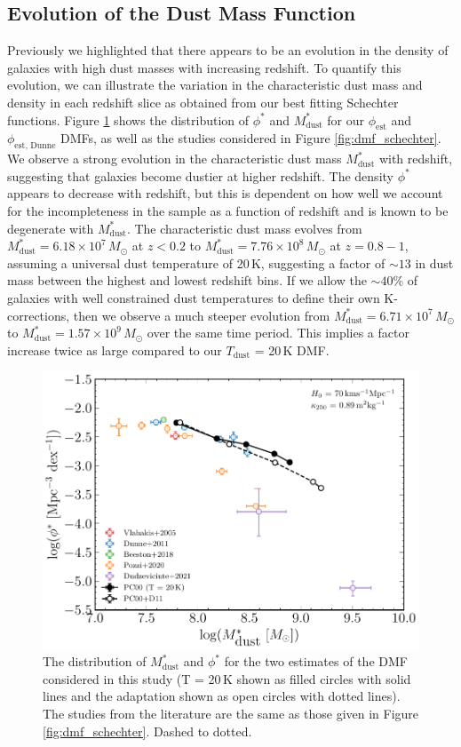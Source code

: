 \subsection{Evolution of the Dust Mass Function}

Previously we highlighted that there appears to be an evolution in the density of galaxies with high dust masses with increasing redshift. To quantify this evolution, we can illustrate the variation in the characteristic dust mass and density in each redshift slice as obtained from our best fitting Schechter functions. Figure \ref{fig:dmf_schechter_parameters} shows the distribution of $\phi^*$ and $M_{\textrm{dust}}^*$ for our $\phi_{\textrm{est}}$ and $\phi_{\textrm{est, Dunne}}$ DMFs, as well as the studies considered in Figure \ref{fig:dmf_schechter}. We observe a strong evolution in the characteristic dust mass $M_{\textrm{dust}}^*$ with redshift, suggesting that galaxies become dustier at higher redshift. The density $\phi^*$ appears to decrease with redshift, but this is dependent on how well we account for the incompleteness in the sample as a function of redshift and is known to be degenerate with $M_{\textrm{dust}}^*$. The characteristic dust mass evolves from $M_{\textrm{dust}}^* = 6.18\times10^7\,M_{\odot}$ at $z < 0.2$ to $M_{\textrm{dust}}^* = 7.76\times10^8\,M_{\odot}$ at $z = 0.8 - 1$, assuming a universal dust temperature of 20\,K, suggesting a factor of $\sim 13$ in dust mass between the highest and lowest redshift bins. If we allow the $\sim 40\%$ of galaxies with well constrained dust temperatures to define their own K-corrections, then we observe a much steeper evolution from $M_{\textrm{dust}}^* = 6.71\times10^7\,M_{\odot}$ to $M_{\textrm{dust}}^* = 1.57\times10^9\,M_{\odot}$ over the same time period. This implies a factor increase twice as large compared to our $T_{\textrm{dust}}$ = 20\,K DMF.

\begin{figure}
	\centering
	\includegraphics[width=0.75\columnwidth]{Figures/dmf_schechter_parameters.pdf}
	\caption[Distribution of $M_{\textrm{dust}}^*$ and $\phi^*$ from best fitting Schechter functions]{The distribution of $M_{\textrm{dust}}^*$ and $\phi^*$ for the two estimates of the DMF considered in this study (T = 20\,K shown as filled circles with solid lines and the \citealt{Dunne_2011} adaptation shown as open circles with dotted lines). The studies from the literature are the same as those given in Figure \ref{fig:dmf_schechter}. {\color{red}Dashed to dotted.}}
	\label{fig:dmf_schechter_parameters}
\end{figure}

